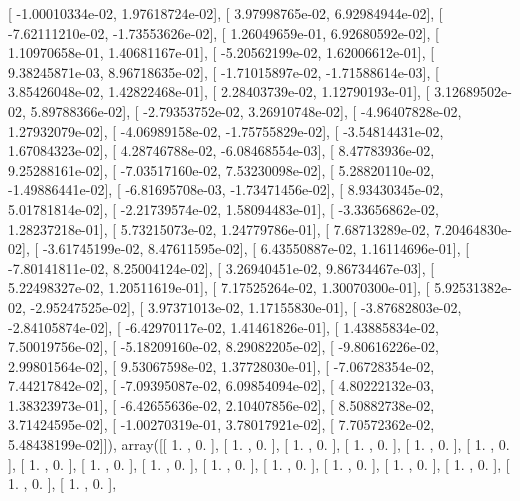 \documentclass{article}
\begin{document}
       [ -1.00010334e-02,   1.97618724e-02],
       [  3.97998765e-02,   6.92984944e-02],
       [ -7.62111210e-02,  -1.73553626e-02],
       [  1.26049659e-01,   6.92680592e-02],
       [  1.10970658e-01,   1.40681167e-01],
       [ -5.20562199e-02,   1.62006612e-01],
       [  9.38245871e-03,   8.96718635e-02],
       [ -1.71015897e-02,  -1.71588614e-03],
       [  3.85426048e-02,   1.42822468e-01],
       [  2.28403739e-02,   1.12790193e-01],
       [  3.12689502e-02,   5.89788366e-02],
       [ -2.79353752e-02,   3.26910748e-02],
       [ -4.96407828e-02,   1.27932079e-02],
       [ -4.06989158e-02,  -1.75755829e-02],
       [ -3.54814431e-02,   1.67084323e-02],
       [  4.28746788e-02,  -6.08468554e-03],
       [  8.47783936e-02,   9.25288161e-02],
       [ -7.03517160e-02,   7.53230098e-02],
       [  5.28820110e-02,  -1.49886441e-02],
       [ -6.81695708e-03,  -1.73471456e-02],
       [  8.93430345e-02,   5.01781814e-02],
       [ -2.21739574e-02,   1.58094483e-01],
       [ -3.33656862e-02,   1.28237218e-01],
       [  5.73215073e-02,   1.24779786e-01],
       [  7.68713289e-02,   7.20464830e-02],
       [ -3.61745199e-02,   8.47611595e-02],
       [  6.43550887e-02,   1.16114696e-01],
       [ -7.80141811e-02,   8.25004124e-02],
       [  3.26940451e-02,   9.86734467e-03],
       [  5.22498327e-02,   1.20511619e-01],
       [  7.17525264e-02,   1.30070300e-01],
       [  5.92531382e-02,  -2.95247525e-02],
       [  3.97371013e-02,   1.17155830e-01],
       [ -3.87682803e-02,  -2.84105874e-02],
       [ -6.42970117e-02,   1.41461826e-01],
       [  1.43885834e-02,   7.50019756e-02],
       [ -5.18209160e-02,   8.29082205e-02],
       [ -9.80616226e-02,   2.99801564e-02],
       [  9.53067598e-02,   1.37728030e-01],
       [ -7.06728354e-02,   7.44217842e-02],
       [ -7.09395087e-02,   6.09854094e-02],
       [  4.80222132e-03,   1.38323973e-01],
       [ -6.42655636e-02,   2.10407856e-02],
       [  8.50882738e-02,   3.71424595e-02],
       [ -1.00270319e-01,   3.78017921e-02],
       [  7.70572362e-02,   5.48438199e-02]]), array([[ 1.        ,  0.        ],
       [ 1.        ,  0.        ],
       [ 1.        ,  0.        ],
       [ 1.        ,  0.        ],
       [ 1.        ,  0.        ],
       [ 1.        ,  0.        ],
       [ 1.        ,  0.        ],
       [ 1.        ,  0.        ],
       [ 1.        ,  0.        ],
       [ 1.        ,  0.        ],
       [ 1.        ,  0.        ],
       [ 1.        ,  0.        ],
       [ 1.        ,  0.        ],
       [ 1.        ,  0.        ],
       [ 1.        ,  0.        ],
       [ 1.        ,  0.        ],
\end{document}
